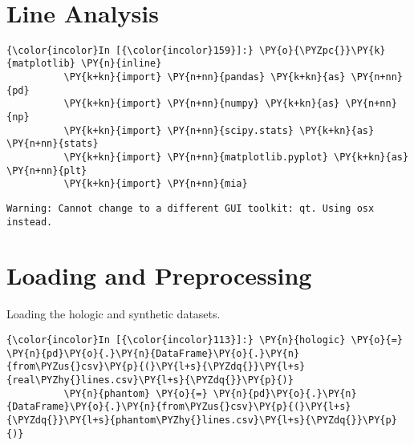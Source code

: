     \begin{center}
    \end{center}
    { \hspace*{\fill} \\}
    
    
\section*{Line Analysis}



    \begin{Verbatim}[commandchars=\\\{\}]
{\color{incolor}In [{\color{incolor}159}]:} \PY{o}{\PYZpc{}}\PY{k}{matplotlib} \PY{n}{inline}
          \PY{k+kn}{import} \PY{n+nn}{pandas} \PY{k+kn}{as} \PY{n+nn}{pd}
          \PY{k+kn}{import} \PY{n+nn}{numpy} \PY{k+kn}{as} \PY{n+nn}{np}
          \PY{k+kn}{import} \PY{n+nn}{scipy.stats} \PY{k+kn}{as} \PY{n+nn}{stats}
          \PY{k+kn}{import} \PY{n+nn}{matplotlib.pyplot} \PY{k+kn}{as} \PY{n+nn}{plt}
          \PY{k+kn}{import} \PY{n+nn}{mia}
\end{Verbatim}

    \begin{Verbatim}[commandchars=\\\{\}]
Warning: Cannot change to a different GUI toolkit: qt. Using osx instead.
    \end{Verbatim}

    \section{Loading and Preprocessing}\label{loading-and-preprocessing}

    Loading the hologic and synthetic datasets.

    \begin{Verbatim}[commandchars=\\\{\}]
{\color{incolor}In [{\color{incolor}113}]:} \PY{n}{hologic} \PY{o}{=} \PY{n}{pd}\PY{o}{.}\PY{n}{DataFrame}\PY{o}{.}\PY{n}{from\PYZus{}csv}\PY{p}{(}\PY{l+s}{\PYZdq{}}\PY{l+s}{real\PYZhy{}lines.csv}\PY{l+s}{\PYZdq{}}\PY{p}{)}
          \PY{n}{phantom} \PY{o}{=} \PY{n}{pd}\PY{o}{.}\PY{n}{DataFrame}\PY{o}{.}\PY{n}{from\PYZus{}csv}\PY{p}{(}\PY{l+s}{\PYZdq{}}\PY{l+s}{phantom\PYZhy{}lines.csv}\PY{l+s}{\PYZdq{}}\PY{p}{)}
\end{Verbatim}

